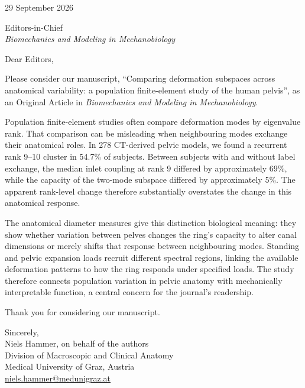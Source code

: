 \documentclass[11pt,a4paper]{article}
\begin{document}
\begin{flushright}29 September 2026\end{flushright}
Editors-in-Chief\\
\textit{Biomechanics and Modeling in Mechanobiology}

Dear Editors,

Please consider our manuscript, \textquotedblleft Comparing deformation subspaces across anatomical variability: a population finite-element study of the human pelvis\textquotedblright, as an Original Article in \textit{Biomechanics and Modeling in Mechanobiology}.

Population finite-element studies often compare deformation modes by eigenvalue rank. That comparison can be misleading when neighbouring modes exchange their anatomical roles. In 278 CT-derived pelvic models, we found a recurrent rank 9--10 cluster in 54.7\% of subjects. Between subjects with and without label exchange, the median inlet coupling at rank 9 differed by approximately 69\%, while the capacity of the two-mode subspace differed by approximately 5\%. The apparent rank-level change therefore substantially overstates the change in this anatomical response.

The anatomical diameter measures give this distinction biological meaning: they show whether variation between pelves changes the ring's capacity to alter canal dimensions or merely shifts that response between neighbouring modes. Standing and pelvic expansion loads recruit different spectral regions, linking the available deformation patterns to how the ring responds under specified loads. The study therefore connects population variation in pelvic anatomy with mechanically interpretable function, a central concern for the journal's readership.

Thank you for considering our manuscript.

Sincerely,\\
Niels Hammer, on behalf of the authors\\
Division of Macroscopic and Clinical Anatomy\\
Medical University of Graz, Austria\\
\href{mailto:niels.hammer@medunigraz.at}{niels.hammer@medunigraz.at}
\end{document}
